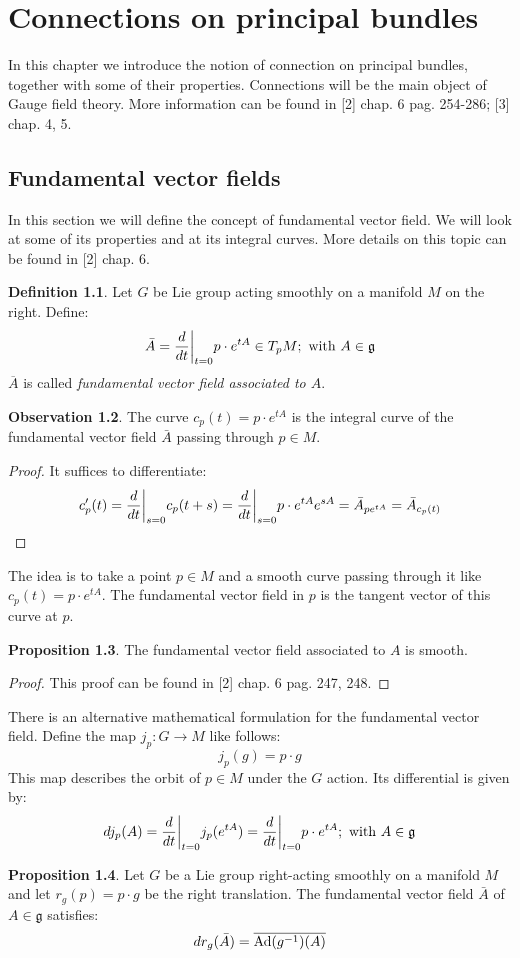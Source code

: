 \documentclass[12pt,a4paper]{report}
\theoremstyle{definition}
\newtheorem{Def}{Definition}[chapter]
\theoremstyle{Theorem}
\newtheorem{Prop}[Def]{Proposition}
\theoremstyle{definition}
\theoremstyle{definition}
\newtheorem{Obs}[Def]{Observation}
\begin{document}
	\chapter{Connections on principal bundles}
	In this chapter we introduce the notion of connection on principal bundles, together with some of their properties. Connections will be the main object of Gauge field theory. More information can be found in [2] chap. 6 pag. 254-286; [3] chap. 4, 5.
	\section{Fundamental vector fields}
	In this section we will define the concept of fundamental vector field. We will look at some of its properties and at its integral curves. More details on this topic can be found in [2] chap. 6.
	\begin{Def}
		Let $G$ be Lie group acting smoothly on a manifold $M$ on the right. Define:
		$$\bar{A}={d\over dt}\bigg|_{t=0}p\cdot e^{tA}\in T_pM;\hbox{ with } A\in\mathfrak{g}$$
		$\overline{A}$ is called \textit{fundamental vector field associated to $A$}.
	\end{Def}
	\begin{Obs}
		The curve $c_p(t)=p\cdot e^{tA}$ is the integral curve of the fundamental vector field $\bar{A}$ passing through $p\in M$.
	\end{Obs}
	\begin{proof}
		It suffices to differentiate:
		$$c'_p(t)={d\over dt}\bigg|_{s=0}c_p(t+s)=
		{d\over dt}\bigg|_{s=0}p\cdot e^{tA}e^{sA}=\bar{A}_{pe^{tA}}=
		\bar{A}_{c_p(t)}$$
	\end{proof}
	The idea is to take a point $p\in M$ and a smooth curve passing through it like $c_p(t)=p\cdot e^{tA}$. The fundamental vector field in $p$ is the tangent vector of this curve at $p$.
	\begin{Prop}\label{Prop_5.1.2}
		The fundamental vector field associated to $A$ is smooth.
	\end{Prop}
	\begin{proof}
		This proof can be found in [2] chap. 6 pag. 247, 248.
	\end{proof}
	There is an alternative mathematical formulation for the fundamental vector field. Define the map $j_p:G\rightarrow M$ like follows:
	$$j_p(g)=p\cdot g$$
	This map describes the orbit of $p\in M$ under the $G$ action. Its differential is given by:
	$$dj_p(A)={d\over dt}\bigg|_{t=0}j_p(e^{tA})={d\over dt}\bigg|_{t=0}p\cdot e^{tA};\hbox{ with }A\in\mathfrak{g}$$
	\begin{Prop}\label{Prop_5.1.1}
		Let $G$ be a Lie group right-acting smoothly on a manifold $M$ and let $r_g(p)=p\cdot g$ be the right translation. The fundamental vector field $\bar{A}$ of $A\in\mathfrak{g}$ satisfies:
		$$dr_g(\bar{A})=\overline{\hbox{Ad}(g^{-1})(A)}$$
	\end{Prop}
\end{document}
